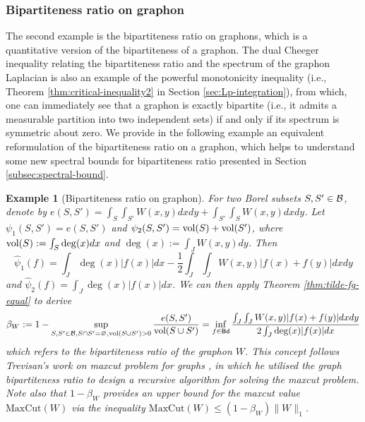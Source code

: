 \documentclass[12pt,a4paper]{article}
\newtheorem{example}[theorem]{Example}
\begin{document}
\subsubsection{Bipartiteness ratio on graphon}
The second example is the bipartiteness ratio on graphons, which is a quantitative version of the bipartiteness of a graphon. 
The dual Cheeger inequality relating the bipartiteness ratio and the spectrum of the graphon Laplacian is also an example of the powerful monotonicity inequality (i.e., Theorem \ref{thm:critical-inequality2} in Section \ref{sec:Lp-integration}), from which, one can immediately see that a graphon is exactly bipartite (i.e., it admits a measurable partition into two independent sets) if and only if its spectrum is symmetric about zero. 
We provide in the following example an equivalent reformulation of the bipartiteness ratio on a graphon, which helps to understand some new spectral bounds for bipartiteness ratio presented in Section \ref{subsec:spectral-bound}.
\begin{example}[Bipartiteness ratio on graphon]\label{exam:bipartiteness} For two Borel subsets $S,S'\in\mathcal{B}$, 
denote by $e(S,S')=\int_S\int_{S'}W(x,y)dxdy+\int_{S'}\int_{S}W(x,y)dxdy$. Let $\psi_1(S,S')=e(S,S')$ and $\psi_2(S,S')=\text{\rm vol}(S)+\text{\rm vol}(S')$, where $\text{\rm vol}(S):=\int_{S}\deg(x)dx$ and $\deg(x):=\int_J W(x,y)dy$. 
Then $$\widehat{\psi}_1(f)=\int_J\deg(x)|f(x)|dx-\frac12\int_{J}\int_{J} W(x,y)|f(x)+f(y)|dxdy$$ and $\widehat{\psi}_2(f)=\int_J\deg(x)|f(x)|dx$. 
We can then apply Theorem \ref{thm:tilde-fg-equal} to derive
$$\beta_W:= 1-\sup_{S,S'\in\mathcal{B},S\cap S'=\varnothing,\text{\rm vol}(S\cup S')>0}\frac{e(S,S')}{\text{\rm vol}(S\cup S')}=\inf_{f\in {\sf Bd}}\frac{\int_J\int_JW(x,y)|f(x)+f(y)|dxdy}{2\int_J\deg(x)|f(x)|dx} $$
which refers to the \emph{bipartiteness ratio} of the graphon $W$. This concept follows Trevisan's work on maxcut problem for graphs \cite{Trevisan2012}, in which he utilised the graph bipartiteness ratio to design a recursive algorithm for solving the maxcut problem. 
Note also that $1-\beta_W$ provides an upper bound for the maxcut value $\text{MaxCut}(W)$ via the inequality $\text{MaxCut}(W)\le (1-\beta_W)\|W\|_1$. 
\end{example}
\end{document}
